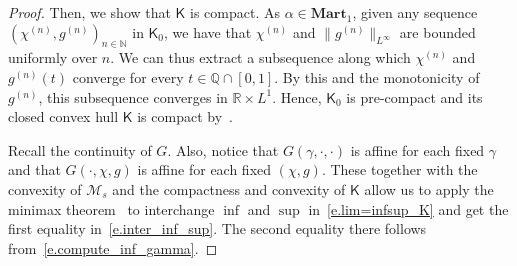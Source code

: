 \documentclass[11pt]{amsart}
\theoremstyle{remark}
\theoremstyle{definition}
\numberwithin{equation}{section}
\numberwithin{proposition}{section}
\numberwithin{figure}{section}
\numberwithin{table}{section}
\newcommand{\N}{\mathbb{N}}
\newcommand{\Q}{\mathbb{Q}}
\newcommand{\R}{\mathbb{R}}
\renewcommand{\d}{\mathrm{d}}
\newcommand{\1}{\mathbf{1}}
\newcommand{\msf}{\mathsf}
\newcommand{\bmart}{\mathbf{Mart}}
\newcommand{\cM}{\mathcal{M}}
\newcommand{\pnp}{{(n)}}
\begin{document}
\begin{proof}
Then, we show that $\msf K$ is compact. As $\alpha\in \bmart_1$, given any sequence $(\chi^\pnp, g^\pnp)_{n\in\N}$ in $\msf K_0$, we have that $\chi^\pnp$ and $\|g^\pnp\|_{L^\infty}$ are bounded uniformly over $n$. We can thus extract a subsequence along which $\chi^\pnp$ and $g^\pnp(t)$ converge for every $t\in\Q\cap[0,1]$. By this and the monotonicity of $g^\pnp$, this subsequence converges in $\R\times L^1$. Hence, $\msf K_0$ is pre-compact and its closed convex hull $\msf K$ is compact by~\cite[Theorem~5.35]{aliprantis2006infinite}.

Recall the continuity of $G$. Also, notice that $G(\gamma,\cdot,\cdot)$ is affine for each fixed $\gamma$ and that $G(\cdot,\chi,g)$ is affine for each fixed $(\chi,g)$. These together with the convexity of $\cM_s$ and the compactness and convexity of $\msf K$ allow us to apply the minimax theorem~\cite{fan1953minimax,sion1958minimax} to interchange $\inf$ and $\sup$ in~\eqref{e.lim=infsup_K} and get the first equality in~\eqref{e.inter_inf_sup}. The second equality there follows from~\eqref{e.compute_inf_gamma}.
\end{proof}


\end{document}
